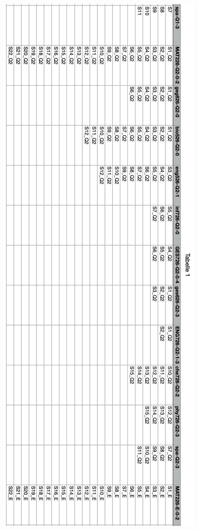 \begin{figure}[H]
    \centering
    \includegraphics[width=0.6\linewidth]{docs/graphics/StudentList2.png}
\end{figure}
